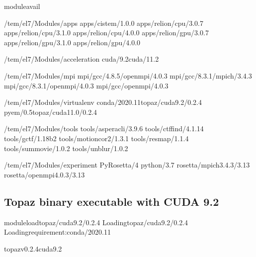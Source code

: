 \documentclass[a4paper,11pt,english]{sphinxmanual}
\begin{document}
\begin{sphinxVerbatim}[commandchars=\\\{\}]
\PYGZdl{}\PYGZgt{}moduleavail

\PYGZhy{}\PYGZhy{}\PYGZhy{}\PYGZhy{}\PYGZhy{}\PYGZhy{}\PYGZhy{}\PYGZhy{}/tem/el7/Modules/apps\PYGZhy{}\PYGZhy{}\PYGZhy{}\PYGZhy{}\PYGZhy{}\PYGZhy{}\PYGZhy{}\PYGZhy{}
apps/cistem/1.0.0
apps/relion/cpu/3.0.7
apps/relion/cpu/3.1.0
apps/relion/cpu/4.0.0
apps/relion/gpu/3.0.7
apps/relion/gpu/3.1.0
apps/relion/gpu/4.0.0

\PYGZhy{}\PYGZhy{}\PYGZhy{}\PYGZhy{}/tem/el7/Modules/acceleration\PYGZhy{}\PYGZhy{}\PYGZhy{}\PYGZhy{}
cuda/9.2cuda/11.2

\PYGZhy{}\PYGZhy{}\PYGZhy{}\PYGZhy{}\PYGZhy{}\PYGZhy{}\PYGZhy{}\PYGZhy{}/tem/el7/Modules/mpi\PYGZhy{}\PYGZhy{}\PYGZhy{}\PYGZhy{}\PYGZhy{}\PYGZhy{}\PYGZhy{}\PYGZhy{}\PYGZhy{}
mpi/gcc/4.8.5/openmpi/4.0.3
mpi/gcc/8.3.1/mpich/3.4.3
mpi/gcc/8.3.1/openmpi/4.0.3
mpi/gcc/openmpi/4.0.3

\PYGZhy{}\PYGZhy{}\PYGZhy{}\PYGZhy{}\PYGZhy{}/tem/el7/Modules/virtualenv\PYGZhy{}\PYGZhy{}\PYGZhy{}\PYGZhy{}\PYGZhy{}
conda/2020.11topaz/cuda\PYGZhy{}9.2/0.2.4
pyem/0.5topaz/cuda\PYGZhy{}11.0/0.2.4

\PYGZhy{}\PYGZhy{}\PYGZhy{}\PYGZhy{}\PYGZhy{}\PYGZhy{}\PYGZhy{}/tem/el7/Modules/tools\PYGZhy{}\PYGZhy{}\PYGZhy{}\PYGZhy{}\PYGZhy{}\PYGZhy{}\PYGZhy{}\PYGZhy{}
tools/aspera\PYGZhy{}cli/3.9.6
tools/ctffind/4.1.14
tools/gctf/1.18\PYGZus{}b2
tools/motioncor2/1.3.1
tools/resmap/1.1.4
tools/summovie/1.0.2
tools/unblur/1.0.2

\PYGZhy{}\PYGZhy{}\PYGZhy{}\PYGZhy{}\PYGZhy{}/tem/el7/Modules/experiment\PYGZhy{}\PYGZhy{}\PYGZhy{}\PYGZhy{}\PYGZhy{}
PyRosetta/4
python/3.7
rosetta/mpich\PYGZhy{}3.4.3/3.13
rosetta/openmpi\PYGZhy{}4.0.3/3.13
\end{sphinxVerbatim}


\subsection{Topaz binary executable with CUDA 9.2}
\label{\detokenize{topaz:topaz-binary-executable-with-cuda-9-2}}
\begin{sphinxVerbatim}[commandchars=\\\{\}]
\PYGZdl{}\PYGZgt{}moduleloadtopaz/cuda\PYGZhy{}9.2/0.2.4
Loadingtopaz/cuda\PYGZhy{}9.2/0.2.4
Loadingrequirement:conda/2020.11

topaz\PYGZhy{}v0.2.4\PYGZhy{}cuda9.2\PYGZdl{}\PYGZgt{}
\end{sphinxVerbatim}
\end{document}
